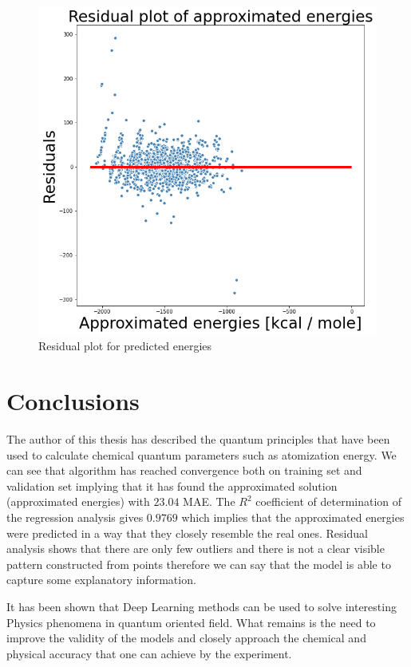 \documentclass[a4paper,oneside,openright,11pt]{book}
\begin{document}
\begin{figure}[h!]
\centering
\includegraphics[scale=0.7]{DocumentFigures/ZdjeciaWalidacja/ResidualsTest.png}
\caption{Residual plot for predicted energies}
\end{figure}




\section{Conclusions}

The author of this thesis has described the quantum principles that have been used to calculate chemical quantum parameters such as atomization energy. We can see that algorithm has reached convergence both on training set and validation set implying that it has found the approximated solution (approximated energies) with $23.04$ MAE. The $R^2$ coefficient of determination of the regression analysis gives $0.9769$ which implies that the approximated energies were predicted in a way that they closely resemble the real ones. Residual analysis shows that there are only few outliers and there is not a clear visible pattern constructed from points therefore we can say that the model is able to capture some explanatory information.

It has been shown that Deep Learning methods can be used to solve interesting Physics phenomena in quantum oriented field. What remains is the need to improve the validity of the models and closely approach the chemical and physical accuracy that one can achieve by the experiment.
\end{document}
